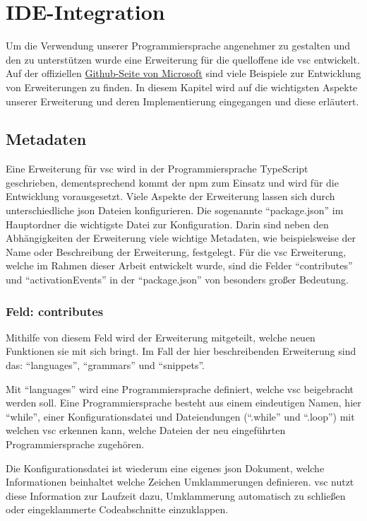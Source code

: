 \chapter{IDE-Integration}
Um die Verwendung unserer Programmiersprache angenehmer zu gestalten und den zu unterstützen wurde eine Erweiterung für die quelloffene \acs{ide} \ac{vsc} entwickelt.
Auf der offiziellen \href{https://github.com/microsoft/vscode-extension-samples}{Github-Seite von Microsoft} sind viele Beispiele zur Entwicklung von Erweiterungen zu finden. \cite{MicrosoftCorporation2022}
In diesem Kapitel wird auf die wichtigsten Aspekte unserer Erweiterung und deren Implementierung eingegangen und diese erläutert. 


\section{Metadaten}
Eine Erweiterung für \ac{vsc} wird in der Programmiersprache TypeScript geschrieben, dementsprechend kommt der \ac{npm} zum Einsatz und wird für die Entwicklung vorausgesetzt.
Viele Aspekte der Erweiterung lassen sich durch unterschiedliche \ac{json} Dateien konfigurieren. 
Die sogenannte \enquote{package.json} im Hauptordner die wichtigste Datei zur Konfiguration.
Darin sind neben den Abhängigkeiten der Erweiterung viele wichtige Metadaten, wie beispielsweise der Name oder Beschreibung der Erweiterung, festgelegt.
Für die \ac{vsc} Erweiterung, welche im Rahmen dieser Arbeit entwickelt wurde, sind die Felder \enquote{contributes} und \enquote{activationEvents} in der \enquote{package.json} von besonders großer Bedeutung. 

\subsection{Feld: contributes}
Mithilfe von diesem Feld wird der Erweiterung mitgeteilt, welche neuen Funktionen sie mit sich bringt.
Im Fall der hier beschreibenden Erweiterung sind das: \enquote{languages}, \enquote{grammars} und \enquote{snippets}. 

Mit \enquote{languages} wird eine Programmiersprache definiert, welche \ac{vsc} beigebracht werden soll.
Eine Programmiersprache besteht aus einem eindeutigen Namen, hier \enquote{while}, einer Konfigurationsdatei und Dateiendungen (\enquote{.while} und \enquote{.loop}) mit welchen \ac{vsc} erkennen kann, welche Dateien der neu eingeführten Programmiersprache zugehören.

Die Konfigurationsdatei ist wiederum eine eigenes \ac{json} Dokument, welche Informationen beinhaltet welche Zeichen Umklammerungen definieren. \ac{vsc} nutzt diese Information zur Laufzeit dazu, Umklammerung automatisch zu schließen oder eingeklammerte Codeabschnitte einzuklappen.

